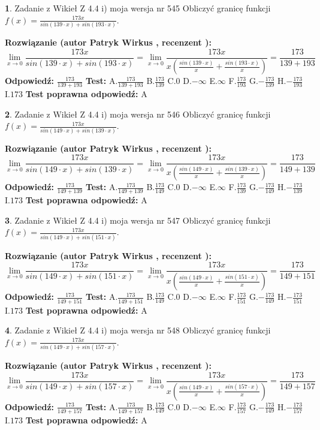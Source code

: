\documentclass[12pt, a4paper]{article}
\theoremstyle{definition} %
\newtheorem{zad}{}
\newcommand{\zadStart}[1]{\begin{zad}#1\newline}
\newcommand{\zadStop}{\end{zad}}
\newcommand{\rozwStart}[2]{\noindent \textbf{Rozwiązanie (autor #1 , recenzent #2): }\newline}
\newcommand{\rozwStop}{\newline}
\newcommand{\odpStart}{\noindent \textbf{Odpowiedź:}\newline}
\newcommand{\odpStop}{\newline}
\newcommand{\testStart}{\noindent \textbf{Test:}\newline}
\newcommand{\testStop}{\newline}
\newcommand{\kluczStart}{\noindent \textbf{Test poprawna odpowiedź:}\newline}
\newcommand{\kluczStop}{\newline}
\begin{document}
\zadStart{Zadanie z Wikieł Z 4.4 i) moja wersja nr 545}
Obliczyć granicę funkcji $f(x)=\frac{173x}{sin(139\cdot x) +sin(193\cdot x)}$.
\zadStop
\rozwStart{Patryk Wirkus}{}
$$\lim\limits_{x\to 0}\frac{173x}{sin(139\cdot x) +sin(193\cdot x)}=\lim\limits_{x\to 0}\frac{173x}{x(\frac{sin(139\cdot x)}{x}+\frac{sin(193\cdot x)}{x})}=\frac{173}{139+193}$$
\rozwStop
\odpStart
$\frac{173}{139+193}$
\odpStop
\testStart
A.$\frac{173}{139+193}$
B.$\frac{173}{139}$
C.$0$
D.$-\infty$
E.$\infty$
F.$\frac{173}{193}$
G.$-\frac{173}{139}$
H.$-\frac{173}{193}$
I.$173$
\testStop
\kluczStart
A
\kluczStop



\zadStart{Zadanie z Wikieł Z 4.4 i) moja wersja nr 546}
Obliczyć granicę funkcji $f(x)=\frac{173x}{sin(149\cdot x) +sin(139\cdot x)}$.
\zadStop
\rozwStart{Patryk Wirkus}{}
$$\lim\limits_{x\to 0}\frac{173x}{sin(149\cdot x) +sin(139\cdot x)}=\lim\limits_{x\to 0}\frac{173x}{x(\frac{sin(149\cdot x)}{x}+\frac{sin(139\cdot x)}{x})}=\frac{173}{149+139}$$
\rozwStop
\odpStart
$\frac{173}{149+139}$
\odpStop
\testStart
A.$\frac{173}{149+139}$
B.$\frac{173}{149}$
C.$0$
D.$-\infty$
E.$\infty$
F.$\frac{173}{139}$
G.$-\frac{173}{149}$
H.$-\frac{173}{139}$
I.$173$
\testStop
\kluczStart
A
\kluczStop



\zadStart{Zadanie z Wikieł Z 4.4 i) moja wersja nr 547}
Obliczyć granicę funkcji $f(x)=\frac{173x}{sin(149\cdot x) +sin(151\cdot x)}$.
\zadStop
\rozwStart{Patryk Wirkus}{}
$$\lim\limits_{x\to 0}\frac{173x}{sin(149\cdot x) +sin(151\cdot x)}=\lim\limits_{x\to 0}\frac{173x}{x(\frac{sin(149\cdot x)}{x}+\frac{sin(151\cdot x)}{x})}=\frac{173}{149+151}$$
\rozwStop
\odpStart
$\frac{173}{149+151}$
\odpStop
\testStart
A.$\frac{173}{149+151}$
B.$\frac{173}{149}$
C.$0$
D.$-\infty$
E.$\infty$
F.$\frac{173}{151}$
G.$-\frac{173}{149}$
H.$-\frac{173}{151}$
I.$173$
\testStop
\kluczStart
A
\kluczStop



\zadStart{Zadanie z Wikieł Z 4.4 i) moja wersja nr 548}
Obliczyć granicę funkcji $f(x)=\frac{173x}{sin(149\cdot x) +sin(157\cdot x)}$.
\zadStop
\rozwStart{Patryk Wirkus}{}
$$\lim\limits_{x\to 0}\frac{173x}{sin(149\cdot x) +sin(157\cdot x)}=\lim\limits_{x\to 0}\frac{173x}{x(\frac{sin(149\cdot x)}{x}+\frac{sin(157\cdot x)}{x})}=\frac{173}{149+157}$$
\rozwStop
\odpStart
$\frac{173}{149+157}$
\odpStop
\testStart
A.$\frac{173}{149+157}$
B.$\frac{173}{149}$
C.$0$
D.$-\infty$
E.$\infty$
F.$\frac{173}{157}$
G.$-\frac{173}{149}$
H.$-\frac{173}{157}$
I.$173$
\testStop
\kluczStart
A
\kluczStop
\end{document}
